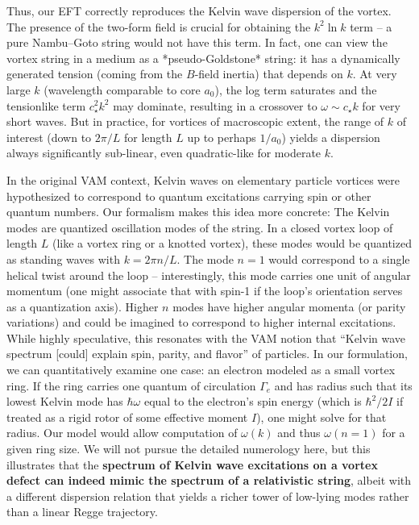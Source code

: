 \documentclass[12pt]{article}
\begin{document}
Thus, our EFT correctly reproduces the Kelvin wave dispersion of the vortex. The presence of the two-form field is crucial for obtaining the $k^2 \ln k$ term – a pure Nambu–Goto string would not have this term. In fact, one can view the vortex string in a medium as a *pseudo-Goldstone* string: it has a dynamically generated tension (coming from the $B$-field inertia) that depends on $k$. At very large $k$ (wavelength comparable to core $a_0$), the log term saturates and the tensionlike term $c_\star^2 k^2$ may dominate, resulting in a crossover to $\omega \sim c_\star k$ for very short waves. But in practice, for vortices of macroscopic extent, the range of $k$ of interest (down to $2\pi/L$ for length $L$ up to perhaps $1/a_0$) yields a dispersion always significantly sub-linear, even quadratic-like for moderate $k$. 

In the original VAM context, Kelvin waves on elementary particle vortices were hypothesized to correspond to quantum excitations carrying spin or other quantum numbers. Our formalism makes this idea more concrete: The Kelvin modes are quantized oscillation modes of the string. In a closed vortex loop of length $L$ (like a vortex ring or a knotted vortex), these modes would be quantized as standing waves with $k = 2\pi n/L$. The mode $n=1$ would correspond to a single helical twist around the loop – interestingly, this mode carries one unit of angular momentum (one might associate that with spin-1 if the loop’s orientation serves as a quantization axis). Higher $n$ modes have higher angular momenta (or parity variations) and could be imagined to correspond to higher internal excitations. While highly speculative, this resonates with the VAM notion that “Kelvin wave spectrum [could] explain spin, parity, and flavor” of particles. In our formulation, we can quantitatively examine one case: an electron modeled as a small vortex ring. If the ring carries one quantum of circulation $\Gamma_e$ and has radius such that its lowest Kelvin mode has $\hbar \omega$ equal to the electron’s spin energy (which is $\hbar^2/2I$ if treated as a rigid rotor of some effective moment $I$), one might solve for that radius. Our model would allow computation of $\omega(k)$ and thus $\omega(n=1)$ for a given ring size. We will not pursue the detailed numerology here, but this illustrates that the \textbf{spectrum of Kelvin wave excitations on a vortex defect can indeed mimic the spectrum of a relativistic string}, albeit with a different dispersion relation that yields a richer tower of low-lying modes rather than a linear Regge trajectory.
\end{document}
